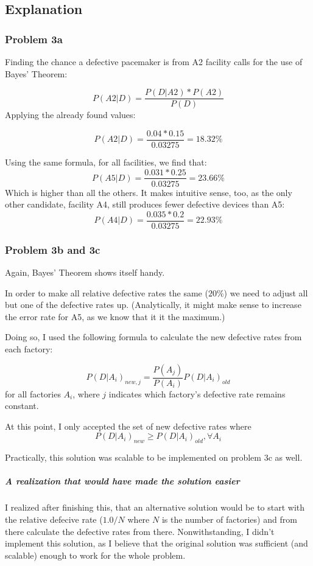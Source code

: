 \documentclass[a4paper,11pt]{article}
\begin{document}
\subsection{Explanation}
\subsubsection{Problem 3a}
Finding the chance a defective pacemaker is from A2 facility calls for the use of Bayes' Theorem:

\[ P(A2 \vert D  ) = \frac{P(D\vert A2  ) * P(A2) }{P(D)} \]
Applying the already found values:

\[ P(A2 \vert D  ) = \frac{0.04 * 0.15 }{0.03275}  = 18.32 \%\]

Using the same formula, for all facilities, we find that:
\[ P(A5 \vert D  ) = \frac{0.031 * 0.25 }{0.03275}  = 23.66\%\]
Which is higher than all the others.
It makes intuitive sense, too, as the only other candidate, facility A4, still produces fewer defective devices than A5:
\[ P(A4 \vert D  ) = \frac{0.035 * 0.2 }{0.03275}  = 22.93\%\]

\subsubsection{Problem 3b and 3c}
Again, Bayes' Theorem shows itself handy.

In order to make all relative defective rates the same ($20\%$) we need to adjust all but one of the defective rates up.
(Analytically, it might make sense to increase the error rate for A5, as we know that it it the maximum.)

Doing so, I used the following formula to calculate the new defective rates from each factory:

\[
P(D \vert A_i)_{new, j} = \frac{P(A_j)}{P(A_i)}P(D\vert A_i)_{old}
\]
for all factories $A_i$, where $j$ indicates which factory's defective rate remains constant.

At this point, I only accepted the set of new defective rates where
\[
P(D \vert A_i)_{new} \geq P(D \vert A_i)_{old},   \forall   A_i
\]

Practically, this solution was scalable to be implemented on problem 3c as well.

\subparagraph{A realization that would have made the solution easier}

I realized after finishing this, that an alternative solution would be to start with the relative defecive rate ($1.0 / N$ where $N$ is the number of factories) and from there calculate the defective rates from there.
Nonwithstanding, I didn't implement this solution, as I believe that the original solution was sufficient (and scalable) enough to work for the whole problem.
\end{document}
